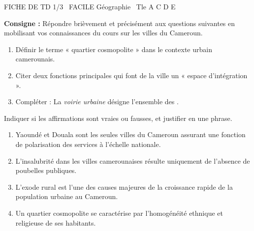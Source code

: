 \documentclass[11pt]{article}
\begin{document}
\begin{tcolorbox}[enhanced,colback=popink,colframe=popink,arc=10pt,boxrule=0pt,left=12pt,right=12pt,top=9pt,bottom=9pt]
{\color{white}\popxbold\small FICHE DE TD 1/3 \textbullet\ FACILE \hfill Géographie \textbullet\ Tle A C D E\par}
\end{tcolorbox}
\vspace{4pt}
\noindent \textbf{Consigne :} Répondre brièvement et précisément aux questions suivantes en mobilisant vos connaissances du cours sur les villes du Cameroun.

\begin{exercice}
\begin{enumerate}
    \item Définir le terme « quartier cosmopolite » dans le contexte urbain camerounais.
    \item Citer deux fonctions principales qui font de la ville un « espace d’intégration ».
    \item Compléter : La \textit{voirie urbaine} désigne l'ensemble des \underline{\hspace{5cm}}.
\end{enumerate}
\end{exercice}

\begin{exercice}
Indiquer si les affirmations sont vraies ou fausses, et justifier en une phrase.
\begin{enumerate}
    \item Yaoundé et Douala sont les seules villes du Cameroun assurant une fonction de polarisation des services à l'échelle nationale.
    \item L'insalubrité dans les villes camerounaises résulte uniquement de l'absence de poubelles publiques.
    \item L'exode rural est l'une des causes majeures de la croissance rapide de la population urbaine au Cameroun.
    \item Un quartier cosmopolite se caractérise par l'homogénéité ethnique et religieuse de ses habitants.
\end{enumerate}
\end{exercice}
\end{document}
